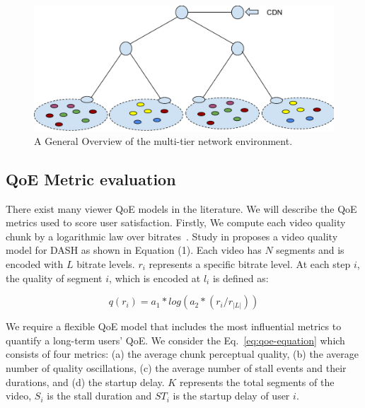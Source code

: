 \begin{figure}
    \centering
    \includegraphics[width=0.9\linewidth]{images/exp-setup-scenario.pdf}
    \caption{A General Overview of the multi-tier network environment.}
    \label{fig:exp-setup-scenario}
\end{figure}



\subsection{QoE Metric evaluation}

There exist many viewer QoE models in the literature. We will describe the QoE metrics used to score user satisfaction. Firstly, We compute each video quality chunk by a logarithmic law over bitrates~\cite{Reichl:TSys2013}. Study in proposes a video quality model for DASH as shown in Equation (1). Each video has $N$ segments and is encoded with $L$ bitrate levels. $r_i$ represents a specific bitrate level. At each step $i$, the quality of segment $i$, which is encoded at $l_i$ is defined as:

$$
q(r_i) = a_1 * log(a_2 * (r_i/ r_{|L|}))
$$

We require a flexible QoE model that includes the most influential metrics to quantify a long-term users' QoE. 
We consider the Eq.~\ref{eq:qoe-equation} which consists of four metrics: (a) the average chunk perceptual quality, (b) the average number of quality oscillations, (c) the average number of stall events and their durations, and (d) the startup delay. $K$ represents the total segments of the video, $S_{i}$ is the stall duration and $ST_{i}$ is the startup delay of user $i$.

